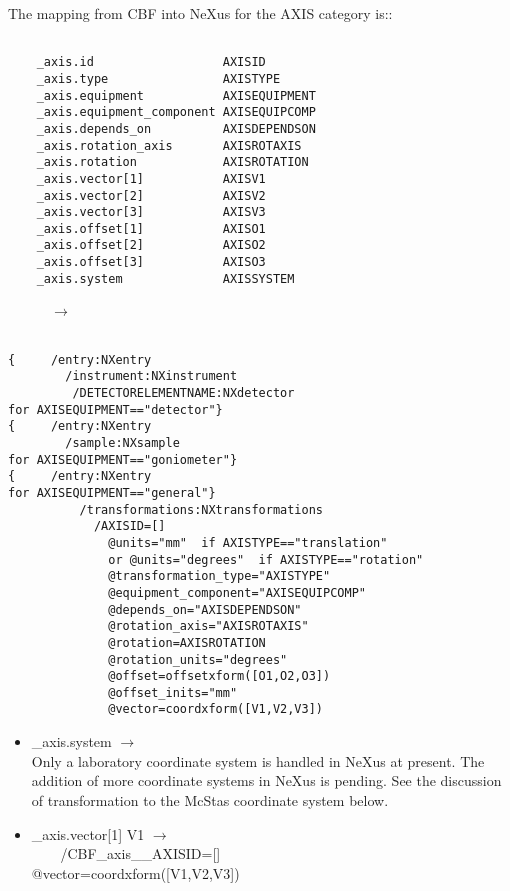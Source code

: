 \documentclass[11pt]{article}
\begin{document}
{The mapping from CBF into NeXus for the AXIS category is::
~~\\
\begin{verbatim}

    _axis.id                  AXISID
    _axis.type                AXISTYPE
    _axis.equipment           AXISEQUIPMENT
    _axis.equipment_component AXISEQUIPCOMP
    _axis.depends_on          AXISDEPENDSON
    _axis.rotation_axis       AXISROTAXIS
    _axis.rotation            AXISROTATION
    _axis.vector[1]           AXISV1
    _axis.vector[2]           AXISV2
    _axis.vector[3]           AXISV3
    _axis.offset[1]           AXISO1
    _axis.offset[2]           AXISO2
    _axis.offset[3]           AXISO3
    _axis.system              AXISSYSTEM

\end{verbatim}
~~~~~~{\bf{}$\rightarrow$}\\
\begin{verbatim}

{     /entry:NXentry
        /instrument:NXinstrument
         /DETECTORELEMENTNAME:NXdetector
for AXISEQUIPMENT=="detector"}
{     /entry:NXentry
        /sample:NXsample
for AXISEQUIPMENT=="goniometer"}
{     /entry:NXentry
for AXISEQUIPMENT=="general"}
          /transformations:NXtransformations
            /AXISID=[]
              @units="mm"  if AXISTYPE=="translation" 
              or @units="degrees"  if AXISTYPE=="rotation"
              @transformation_type="AXISTYPE"
              @equipment_component="AXISEQUIPCOMP"
              @depends_on="AXISDEPENDSON"
              @rotation_axis="AXISROTAXIS"
              @rotation=AXISROTATION
              @rotation_units="degrees"
              @offset=offsetxform([O1,O2,O3])
              @offset_inits="mm"
              @vector=coordxform([V1,V2,V3])
\end{verbatim}


\begin{itemize}
\item{\_axis.system $\rightarrow$ \\
Only a laboratory coordinate system is handled in NeXus at present.
The addition of more coordinate systems in NeXus is pending.
See the discussion of transformation to the McStas coordinate system
below.  }

\item{\_axis.vector[1] V1 $\rightarrow$ \\
\verb|    |/CBF\_axis\_\_AXISID=[]\\
  @vector=coordxform([V1,V2,V3])}


\end{itemize}}
\end{document}
